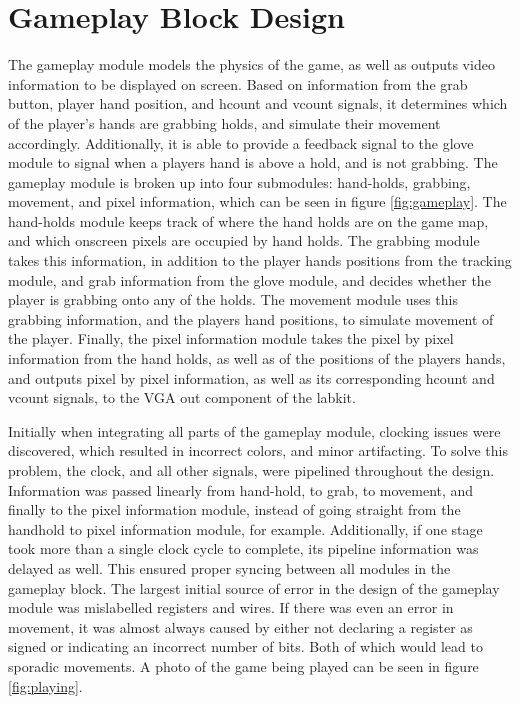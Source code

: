 \section{Gameplay Block Design}
\label{sec:game}

The gameplay module models the physics of the game, as well as outputs video
information to be displayed on screen. Based on information from the grab
button, player hand position, and
hcount and vcount signals, it determines which of the player's hands are
grabbing holds, and simulate their movement accordingly. Additionally, it is
able to provide a feedback signal to the glove module to signal when a players
hand is above a hold, and is not grabbing. The gameplay module is broken up into
four submodules: hand-holds, grabbing, movement, and pixel information, which
can be seen in figure \ref{fig:gameplay}. The hand-holds module keeps track of where the
hand holds are on the game map, and which onscreen pixels are occupied by hand
holds. The grabbing module takes this information, in addition to the player
hands positions from the tracking module, and grab information from the glove
module, and decides whether the player is grabbing onto any of the holds. The
movement module uses this grabbing information, and the players hand positions,
to simulate movement of the player. Finally, the pixel information module takes
the pixel by pixel information from the hand holds, as well as of the positions
of the players hands, and outputs pixel by pixel information, as well as its
corresponding hcount and vcount signals, to the VGA out component of the labkit.

Initially when integrating all parts of the gameplay module, clocking issues
were discovered, which resulted in incorrect colors, and minor artifacting. To
solve this problem, the clock, and all other signals, were pipelined throughout
the design. Information was passed linearly from hand-hold, to grab, to
movement, and finally to the pixel information module, instead of going straight
from the handhold to pixel information module, for example. Additionally, if one
stage took more than a single clock cycle to complete, its pipeline information
was delayed as well. This ensured proper syncing between all modules in the
gameplay block. The largest initial source of error in the design of the
gameplay module was mislabelled registers and wires. If there was even an error
in movement, it was almost always caused by either not declaring a register as
signed or indicating an incorrect number of bits. Both of which would lead to
sporadic movements. A photo of the game being played can be seen in figure
\ref{fig:playing}.

